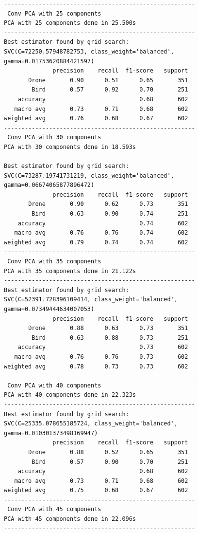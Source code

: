 \documentclass{cta-author}
\begin{document}
\begin{lstlisting}
-------------------------------------------------------
 Conv PCA with 25 components
PCA with 25 components done in 25.500s
-------------------------------------------------------
Best estimator found by grid search:
SVC(C=72250.57948782753, class_weight='balanced', gamma=0.01753620884421597)
              precision    recall  f1-score   support
       Drone       0.90      0.51      0.65       351
        Bird       0.57      0.92      0.70       251
    accuracy                           0.68       602
   macro avg       0.73      0.71      0.68       602
weighted avg       0.76      0.68      0.67       602
-------------------------------------------------------
 Conv PCA with 30 components
PCA with 30 components done in 18.593s
-------------------------------------------------------
Best estimator found by grid search:
SVC(C=73287.19741731219, class_weight='balanced', gamma=0.06674065877896472)
              precision    recall  f1-score   support
       Drone       0.90      0.62      0.73       351
        Bird       0.63      0.90      0.74       251
    accuracy                           0.74       602
   macro avg       0.76      0.76      0.74       602
weighted avg       0.79      0.74      0.74       602
-------------------------------------------------------
 Conv PCA with 35 components
PCA with 35 components done in 21.122s
-------------------------------------------------------
Best estimator found by grid search:
SVC(C=52391.728396109414, class_weight='balanced', gamma=0.07349444634007053)
              precision    recall  f1-score   support
       Drone       0.88      0.63      0.73       351
        Bird       0.63      0.88      0.73       251
    accuracy                           0.73       602
   macro avg       0.76      0.76      0.73       602
weighted avg       0.78      0.73      0.73       602
-------------------------------------------------------
 Conv PCA with 40 components
PCA with 40 components done in 22.323s
-------------------------------------------------------
Best estimator found by grid search:
SVC(C=25335.078655185724, class_weight='balanced', gamma=0.010301373498169947)
              precision    recall  f1-score   support
       Drone       0.88      0.52      0.65       351
        Bird       0.57      0.90      0.70       251
    accuracy                           0.68       602
   macro avg       0.73      0.71      0.68       602
weighted avg       0.75      0.68      0.67       602
-------------------------------------------------------
 Conv PCA with 45 components
PCA with 45 components done in 22.096s
-------------------------------------------------------

\end{lstlisting}
\end{document}
